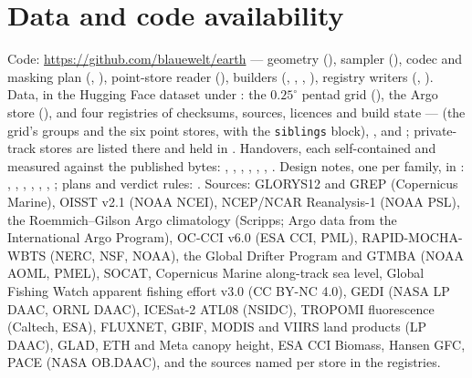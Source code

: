 \documentclass[10pt]{article}
\newcommand{\code}[1]{\texttt{#1}}
\begin{document}
\section{Data and code availability}\label{app:avail}
\begin{sloppypar}
Code: \url{https://github.com/blauewelt/earth} --- geometry
(), sampler (), codec and masking
plan (, ), point-store reader
(), builders (,
, ,
), registry writers
(, ).
Data, in the Hugging Face dataset  under
: the $0.25^\circ$ pentad grid
(), the Argo store
(), and four registries of checksums, sources,
licences and build state ---  (the grid's
groups and the six point stores, with the \code{siblings} block),
,  and
; private-track stores are listed there
and held in . Handovers, each
self-contained and measured against the published bytes:
, ,
, ,
, ,
. Design notes, one per family, in
: , ,
, , ,
, ; plans and verdict rules:
. Sources: GLORYS12 and GREP (Copernicus Marine),
OISST v2.1 (NOAA NCEI), NCEP/NCAR Reanalysis-1 (NOAA PSL), the
Roemmich--Gilson Argo climatology (Scripps; Argo data from the International
Argo Program), OC-CCI v6.0 (ESA CCI, PML), RAPID-MOCHA-WBTS (NERC, NSF,
NOAA), the Global Drifter Program and GTMBA (NOAA AOML, PMEL), SOCAT,
Copernicus Marine along-track sea level, Global Fishing Watch apparent
fishing effort v3.0 (CC BY-NC 4.0), GEDI (NASA LP DAAC, ORNL DAAC),
ICESat-2 ATL08 (NSIDC), TROPOMI fluorescence (Caltech, ESA), FLUXNET,
GBIF, MODIS and VIIRS land products (LP DAAC), GLAD, ETH and Meta canopy
height, ESA CCI Biomass, Hansen GFC, PACE (NASA OB.DAAC), and the sources
named per store in the registries.
\end{sloppypar}
\end{document}
